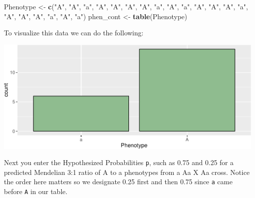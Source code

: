 \documentclass[twoside, 12pt]{article}
\newenvironment{Shaded}{\begin{snugshade}}{\end{snugshade}}
\newcommand{\KeywordTok}[1]{\textcolor[rgb]{0.13,0.29,0.53}{\textbf{{#1}}}}
\newcommand{\DataTypeTok}[1]{\textcolor[rgb]{0.13,0.29,0.53}{{#1}}}
\newcommand{\StringTok}[1]{\textcolor[rgb]{0.31,0.60,0.02}{{#1}}}
\newcommand{\NormalTok}[1]{{#1}}
\begin{document}
\begin{Shaded}
\begin{Highlighting}[]
\NormalTok{Phenotype <-}\StringTok{ }\KeywordTok{c}\NormalTok{(}\StringTok{"A"}\NormalTok{, }\StringTok{"A"}\NormalTok{, }\StringTok{"a"}\NormalTok{, }\StringTok{"A"}\NormalTok{, }\StringTok{"A"}\NormalTok{, }\StringTok{"A"}\NormalTok{, }\StringTok{"A"}\NormalTok{,}
               \StringTok{"a"}\NormalTok{, }\StringTok{"A"}\NormalTok{, }\StringTok{"a"}\NormalTok{, }\StringTok{"A"}\NormalTok{, }\StringTok{"A"}\NormalTok{, }\StringTok{"A"}\NormalTok{, }\StringTok{"a"}\NormalTok{,}
               \StringTok{"A"}\NormalTok{, }\StringTok{"A"}\NormalTok{, }\StringTok{"A"}\NormalTok{, }\StringTok{"a"}\NormalTok{, }\StringTok{"A"}\NormalTok{, }\StringTok{"a"}\NormalTok{)}
\NormalTok{phen_cont <-}\StringTok{ }\KeywordTok{table}\NormalTok{(Phenotype)}
\end{Highlighting}
\end{Shaded}

To visualize this data we can do the following:

\begin{Shaded}
\end{Shaded}

\includegraphics{skeleton_files/figure-latex/unnamed-chunk-77-1.pdf}

Next you enter the Hypothesized Probabilities \texttt{p}, such as 0.75
and 0.25 for a predicted Mendelian 3:1 ratio of A to a phenotypes from a
Aa X Aa cross. Notice the order here matters so we designate 0.25 first
and then 0.75 since \texttt{a} came before \texttt{A} in our table.
\end{document}
